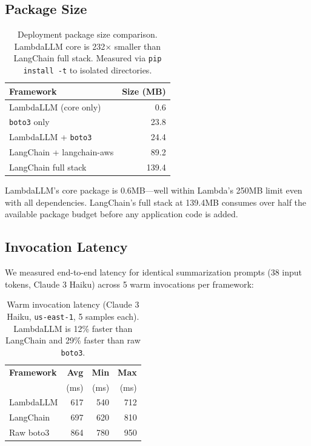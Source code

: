 \documentclass[10pt,twocolumn,letterpaper]{article}
\begin{document}
\subsection{Package Size}

\begin{table}[h]
\centering
\small
\caption{Deployment package size comparison. LambdaLLM core is 232$\times$ smaller than LangChain full stack. Measured via \texttt{pip install -t} to isolated directories.}
\label{tab:package_size}
\begin{tabular}{lr}
\toprule
\textbf{Framework} & \textbf{Size (MB)} \\
\midrule
LambdaLLM (core only)       & 0.6   \\
\texttt{boto3} only         & 23.8  \\
LambdaLLM + \texttt{boto3}  & 24.4  \\
LangChain + langchain-aws   & 89.2  \\
LangChain full stack        & 139.4 \\
\bottomrule
\end{tabular}
\end{table}

LambdaLLM's core package is 0.6MB---well within Lambda's 250MB limit even with all dependencies. LangChain's full stack at 139.4MB consumes over half the available package budget before any application code is added.

\subsection{Invocation Latency}

We measured end-to-end latency for identical summarization prompts (38 input tokens, Claude 3 Haiku) across 5 warm invocations per framework:

\begin{table}[h]
\centering
\small
\caption{Warm invocation latency (Claude 3 Haiku, \texttt{us-east-1}, 5 samples each). LambdaLLM is 12\% faster than LangChain and 29\% faster than raw \texttt{boto3}.}
\label{tab:latency}
\begin{tabular}{lrrr}
\toprule
\textbf{Framework} & \textbf{Avg} & \textbf{Min} & \textbf{Max} \\
                   & (ms)         & (ms)         & (ms)         \\
\midrule
LambdaLLM   & 617 & 540 & 712 \\
LangChain   & 697 & 620 & 810 \\
Raw boto3   & 864 & 780 & 950 \\
\bottomrule
\end{tabular}
\end{table}
\end{document}
